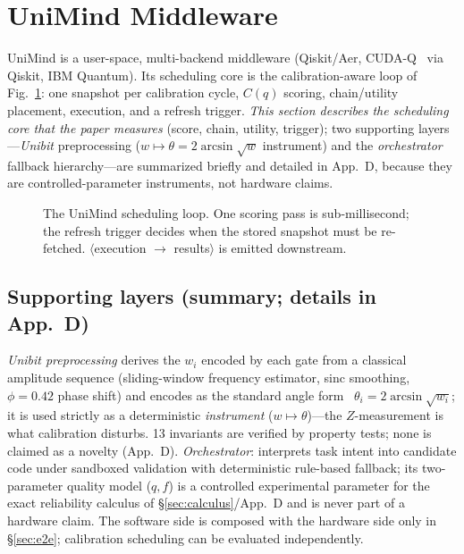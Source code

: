 \documentclass[journal,10pt,twocolumn]{IEEEtran}
\begin{document}
\section{UniMind Middleware}
\label{sec:architecture}
UniMind is a user-space, multi-backend middleware (Qiskit/Aer, CUDA-Q~\cite{cuquantum} via Qiskit, IBM Quantum).
Its scheduling core is the calibration-aware loop of Fig.~\ref{fig:loop}: one snapshot per calibration cycle,
$C(q)$ scoring, chain/utility placement, execution, and a refresh trigger.
\emph{This section describes the scheduling core that the paper measures} (score, chain, utility, trigger);
two supporting layers---\emph{Unibit} preprocessing ($w\mapsto\theta=2\arcsin\sqrt{w}$ instrument) and the
\emph{orchestrator} fallback hierarchy---are summarized briefly and detailed in App.~D, because they are
controlled-parameter instruments, not hardware claims.

\begin{figure}[t]
\centering
{}
\caption{The UniMind scheduling loop. One scoring pass is sub-millisecond; the refresh trigger decides when the
stored snapshot must be re-fetched. $\langle$execution $\to$ results$\rangle$ is emitted downstream.}
\label{fig:loop}
\end{figure}

\subsection{Supporting layers (summary; details in App.~D)}
\emph{Unibit preprocessing} derives the $w_i$ encoded by each gate from a classical amplitude sequence
(sliding-window frequency estimator, sinc smoothing, $\phi{=}0.42$ phase shift) and encodes as the standard
angle form~\cite{schuld2018,hhavlicek2019} $\theta_i{=}2\arcsin\sqrt{w_i}$; it is used strictly as a deterministic
\emph{instrument} ($w\mapsto\theta$)---the $Z$-measurement is what calibration disturbs. 13 invariants are
verified by property tests; none is claimed as a novelty (App.~D).
\emph{Orchestrator}: interprets task intent into candidate code under sandboxed validation with deterministic
rule-based fallback; its two-parameter quality model ($q,f$) is a controlled experimental parameter for the
exact reliability calculus of \S\ref{sec:calculus}/App.~D and is never part of a hardware claim. The software
side is composed with the hardware side only in \S\ref{sec:e2e}; calibration scheduling can be evaluated
independently.
\end{document}
